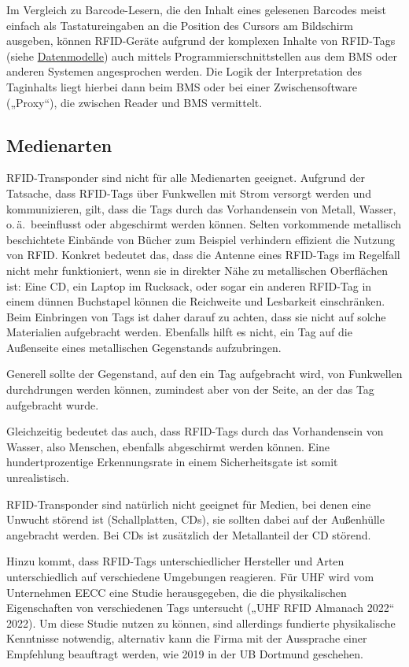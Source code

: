 \documentclass[
  11pt,
  letterpaper,
  DIV=11,
  twoside]{scrreprt}
\begin{document}
Im Vergleich zu Barcode-Lesern, die den Inhalt eines gelesenen Barcodes
meist einfach als Tastatureingaben an die Position des Cursors am
Bildschirm ausgeben, können RFID-Geräte aufgrund der komplexen Inhalte
von RFID-Tags (siehe \hyperref[datenmodelle]{Datenmodelle}) auch mittels
Programmierschnittstellen aus dem BMS oder anderen Systemen angesprochen
werden. Die Logik der Interpretation des Taginhalts liegt hierbei dann
beim BMS oder bei einer Zwischensoftware („Proxy``), die zwischen Reader
und BMS vermittelt.

\subsection{Medienarten}\label{medienarten}

RFID-Transponder sind nicht für alle Medienarten geeignet. Aufgrund der
Tatsache, dass RFID-Tags über Funkwellen mit Strom versorgt werden und
kommunizieren, gilt, dass die Tags durch das Vorhandensein von Metall,
Wasser, o.\,ä.~beeinflusst oder abgeschirmt werden können. Selten
vorkommende metallisch beschichtete Einbände von Bücher zum Beispiel
verhindern effizient die Nutzung von RFID. Konkret bedeutet das, dass
die Antenne eines RFID-Tags im Regelfall nicht mehr funktioniert, wenn
sie in direkter Nähe zu metallischen Oberflächen ist: Eine CD, ein
Laptop im Rucksack, oder sogar ein anderen RFID-Tag in einem dünnen
Buchstapel können die Reichweite und Lesbarkeit einschränken. Beim
Einbringen von Tags ist daher darauf zu achten, dass sie nicht auf
solche Materialien aufgebracht werden. Ebenfalls hilft es nicht, ein Tag
auf die Außenseite eines metallischen Gegenstands aufzubringen.

Generell sollte der Gegenstand, auf den ein Tag aufgebracht wird, von
Funkwellen durchdrungen werden können, zumindest aber von der Seite, an
der das Tag aufgebracht wurde.

Gleichzeitig bedeutet das auch, dass RFID-Tags durch das Vorhandensein
von Wasser, also Menschen, ebenfalls abgeschirmt werden können. Eine
hundertprozentige Erkennungsrate in einem Sicherheitsgate ist somit
unrealistisch.

RFID-Transponder sind natürlich nicht geeignet für Medien, bei denen
eine Unwucht störend ist (Schallplatten, CDs), sie sollten dabei auf der
Außenhülle angebracht werden. Bei CDs ist zusätzlich der Metallanteil
der CD störend.

Hinzu kommt, dass RFID-Tags unterschiedlicher Hersteller und Arten
unterschiedlich auf verschiedene Umgebungen reagieren. Für UHF wird vom
Unternehmen EECC eine Studie herausgegeben, die die physikalischen
Eigenschaften von verschiedenen Tags untersucht ({„{UHF} {RFID} Almanach
2022``} 2022). Um diese Studie nutzen zu können, sind allerdings
fundierte physikalische Kenntnisse notwendig, alternativ kann die Firma
mit der Aussprache einer Empfehlung beauftragt werden, wie 2019 in der
UB Dortmund geschehen.
\end{document}
